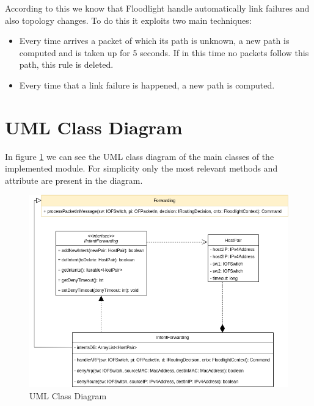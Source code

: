 \documentclass[a4paper]{report}
\begin{document}
	\noindent According to this we know that Floodlight handle automatically link failures and also topology changes. To do this it exploits two main techniques:
	
	\begin{itemize}
        \item Every time arrives a packet of which its path is unknown, a new path is computed and is taken up for 5 seconds. If in this time no packets follow this path, this rule is deleted.

	\item Every time that a link failure is happened, a new path is computed.
	\end{itemize}
	
	\section{UML Class Diagram}
	\noindent In figure \ref{img:class_diagram} we can see the UML class diagram of the main classes of the implemented module. For simplicity only the most relevant methods and attribute are present in the diagram.
	
	\begin{figure}[htp]
		\centering
		\includegraphics[width=0.7\linewidth]{img/uml.png}
		\caption{UML Class Diagram}
		\label{img:class_diagram}
	\end{figure}
	
	
\end{document}
